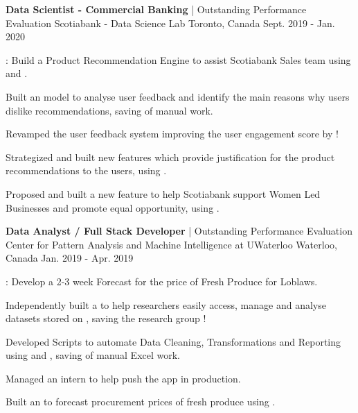\begin{cventries}
  \cventry
    {\textbf{Data Scientist - Commercial Banking} | Outstanding Performance Evaluation} %
    {Scotiabank - Data Science Lab} %
    {Toronto, Canada} %
    {Sept. 2019 - Jan. 2020} %
    {
      \begin{cvitems} %
        \item {: Build a Product Recommendation Engine to assist Scotiabank Sales team using  and .}
        \item {Built an  model to analyse user feedback and identify the main reasons why users dislike recommendations, saving  of manual work.}
        \item Revamped the user feedback system improving the user engagement score by !
        \item {Strategized and built new features which provide justification for the product recommendations to the users, using .}
        \item {Proposed and built a new feature to help Scotiabank support Women Led Businesses and promote equal opportunity, using .}
      \end{cvitems}
    }

  \cventry
    {\textbf{Data Analyst / Full Stack Developer} | Outstanding Performance Evaluation} %
    {Center for Pattern Analysis and Machine Intelligence at UWaterloo} %
    {Waterloo, Canada} %
    {Jan. 2019 - Apr. 2019} %
    {
      \begin{cvitems} %
        \item {: Develop a 2-3 week Forecast for the price of Fresh Produce for Loblaws.}
        \item {Independently built a  to help researchers easily access, manage and analyse datasets stored on , saving the research group !}
        \item {Developed  Scripts to automate Data Cleaning, Transformations and Reporting using  and , saving  of manual Excel work.}
        \item {Managed an intern to help push the app in production.}
		\item {Built an  to forecast procurement prices of fresh produce using .}
      \end{cvitems}
    }
\end{cventries}
